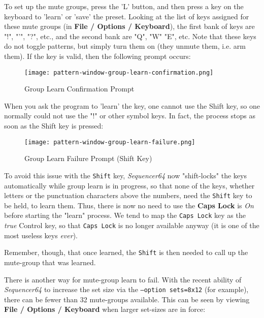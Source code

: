    To set up the mute groups, press the 'L' button, and then press a key on
   the keyboard to 'learn' or 'save' the preset. Looking at the list of keys
   assigned for these mute groups (in \textbf{File / Options / Keyboard}),
   the first bank of keys are "!", "'", "?", etc., and the second bank are
   "Q", "W" "E", etc.  Note that these keys do not toggle patterns, but simply
   turn them on (they unmute them, i.e. arm them).
   If the key is valid, then the following prompt occurs:

\begin{figure}[H]
   \centering 
   \texttt{[image: pattern-window-group-learn-confirmation.png]}
   \caption{Group Learn Confirmation Prompt}
   \label{fig:pattern_window_group_learn_confirmation}
\end{figure}
   
   When you ask the program to 'learn' the key, one cannot
   use the Shift key, so one normally could not use the "!" or
   other symbol keys.
   In fact, the process stops as soon as the Shift key is pressed:

\begin{figure}[H]
   \centering 
   \texttt{[image: pattern-window-group-learn-failure.png]}
   \caption{Group Learn Failure Prompt (Shift Key)}
   \label{fig:pattern_window_group_learn_failure}
\end{figure}

   To avoid this issue with the \texttt{Shift} key, \textsl{Sequencer64} now
   "shift-locks" the keys automatically while group learn is in progress, so
   that none of the keys, whether letters or the punctuation characters above
   the numbers, need the \texttt{Shift} key to be held, to learn them.
   Thus, there is now no need to use the \textbf{Caps Lock} is \textsl{On} before
   starting the "learn" process.  We tend to map the
   \texttt{Caps Lock} key as the \textsl{true} Control key, so that
   \texttt{Caps Lock} is no longer available anyway
   (it is one of the most useless keys \textsl{ever}).

   Remember, though, that once learned, the \texttt{Shift} is then
   needed to call up the mute-group that was learned.

   There is another way for mute-group learn to fail.
   With the recent ability of \textsl{Sequencer64} to increase the set size via
   the \texttt{--option sets=8x12} (for example), there can be fewer than 32
   mute-groups available.   This can be seen by viewing
   \textbf{File / Options / Keyboard} when larger set-sizes are in force:

